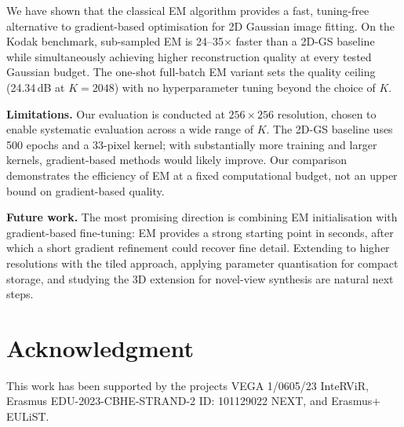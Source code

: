 \documentclass[a4paper,conference]{IEEEtran}
\begin{document}
We have shown that the classical EM algorithm provides a fast, tuning-free
alternative to gradient-based optimisation for 2D Gaussian image fitting.
On the Kodak benchmark, sub-sampled EM is 24--35$\times$ faster than a
2D-GS baseline while simultaneously achieving higher reconstruction
quality at every tested Gaussian budget.
The one-shot full-batch EM variant sets the quality ceiling (24.34\,dB
at $K\!=\!2048$) with no hyperparameter tuning beyond the choice of $K$.

\textbf{Limitations.}
Our evaluation is conducted at $256\!\times\!256$ resolution, chosen to
enable systematic evaluation across a wide range of $K$.
The 2D-GS baseline uses 500 epochs and a 33-pixel kernel; with
substantially more training and larger kernels, gradient-based methods
would likely improve.
Our comparison demonstrates the efficiency of EM at a fixed computational
budget, not an upper bound on gradient-based quality.

\textbf{Future work.}
The most promising direction is combining EM initialisation with
gradient-based fine-tuning: EM provides a strong starting point in seconds,
after which a short gradient refinement could recover fine detail.
Extending to higher resolutions with the tiled approach, applying parameter
quantisation for compact storage, and studying the 3D extension for
novel-view synthesis are natural next steps.

\section*{Acknowledgment}
This work has been supported by the projects VEGA 1/0605/23 InteRViR,
Erasmus EDU-2023-CBHE-STRAND-2 ID: 101129022 NEXT, and Erasmus+ EULiST.



\end{document}
